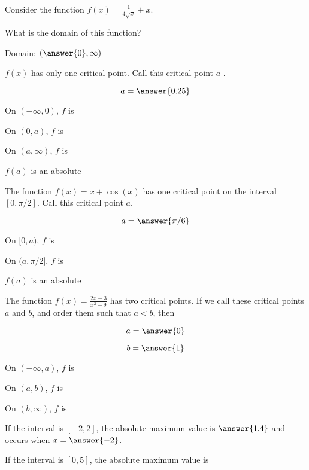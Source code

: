 \documentclass[handout]{ximera}
\begin{document}
\begin{exercise}
Consider the function $f(x) =\displaystyle\frac{1}{4\sqrt{x}}+x$.

What is the domain of this function? 

Domain: $ (\answer{0}, \infty)$

$f(x)$ has only one critical point.  Call this critical point $a$ .

$$
a = \answer{0.25}
$$

On $(-\infty,0)$, $f$ is 

On $(0,a)$, $f$ is 

On $(a,\infty)$, $f$ is 

$f(a)$ is an absolute 

\end{exercise}

\begin{exercise}
The function $f(x) =x+\cos(x)$ has one critical point on the interval $[0,\pi/2]$. Call this critical point $a$.

$$
a = \answer{\pi/6}
$$

On $[0,a)$, $f$ is 

On $(a,\pi/2]$, $f$ is 

$f(a)$ is an absolute 

\end{exercise}


\begin{exercise}
The function $f(x)=\displaystyle{\frac{2x-3}{x^2-9}}$ has two critical points.  If we
call these critical points $a$ and $b$, and order them such that $a <
b $, then

$$
a = \answer{0}
$$

$$
b=\answer{1}
$$

On $(-\infty,a)$, $f$ is 

On $(a,b)$, $f$ is 

On $(b,\infty)$, $f$ is 

If the interval is $[-2,2]$, the absolute maximum value is $\answer{1.4}$ and occurs when $x = \answer{-2}$.

\vspace{.25in}

If the interval is $[0,5]$, the absolute maximum value is 


\end{exercise}
\end{document}
